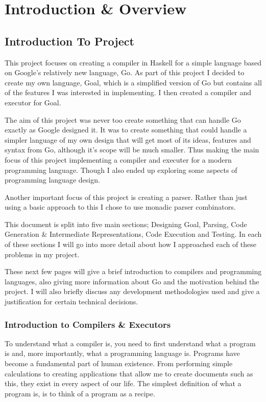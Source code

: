 
\chapter{Introduction \& Overview}

\section{Introduction To Project}

This project focuses on creating a compiler in Haskell for a simple language based on Google's relatively new language, Go. As part of this project I decided to create my own language, Goal, which is a simplified version of Go but contains all of the features I was interested in implementing. I then created a compiler and executor for Goal. 

The aim of this project was never too create something that can handle Go exactly as Google designed it. It was to create something that could handle a simpler language of my own design that will get most of its ideas, features and syntax from Go, although it's scope will be much smaller. Thus making the main focus of this project implementing a compiler and executer for a modern programming language. Though I also ended up exploring some aspects of programming language design.

Another important focus of this project is creating a parser. Rather than just using a basic approach to this I chose to use monadic parser combinators. 

This document is split into five main sections; Designing Goal, Parsing, Code Generation \& Intermediate Representations, Code Execution and Testing. In each of these sections I will go into more detail about how I approached each of these problems in my project. 

These next few pages will give a brief introduction to compilers and programming languages, also giving more information about Go and the motivation behind the project. I will also briefly discuss any development methodologies used and give a justification for certain technical decisions.

\subsection{Introduction to Compilers \& Executors}

To understand what a compiler is, you need to first understand what a program is and, more importantly, what a programming language is. Programs have become a fundamental part of human existence. From performing simple calculations to creating applications that allow me to create documents such as this, they exist in every aspect of our life. The simplest definition of what a program is, is to think of a program as a recipe.  

